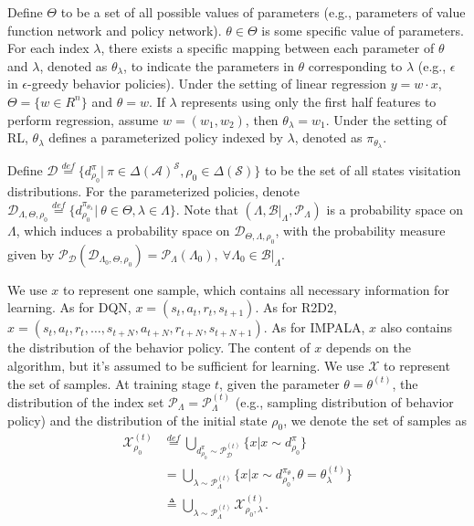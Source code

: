 Define $\Theta$ to be a set of all possible values of parameters (e.g., parameters of value function network and policy network).
$\theta \in \Theta$ is some specific value of parameters.
For each index $\lambda$, there exists a specific mapping between each parameter of $\theta$ and $\lambda$, denoted as $\theta_\lambda$, to indicate the parameters in $\theta$ corresponding to $\lambda$ (e.g., $\epsilon$ in $\epsilon$-greedy behavior policies).
Under the setting of linear regression $y = w \cdot x$, $\Theta = \{w \in R^n\}$ and $\theta = w$.
If $\lambda$ represents using only the first half features to perform regression, assume $w = (w_1, w_2)$, then $\theta_\lambda = w_1$.  
Under the setting of RL, $\theta_{\lambda}$ defines a parameterized policy indexed by $\lambda$, denoted as $\pi_{\theta_{\lambda}}$.

Define $\mathcal{D} \overset{def}{=} \{d^\pi_{\rho_{0}} |\ \pi \in {\Delta (\mathcal{A})}^\mathcal{S}, \rho_{0} \in \Delta(\mathcal{S}) \}$ to be the set of all states visitation distributions.
For the parameterized policies, denote 
$\mathcal{D}_{\Lambda, \Theta, \rho_{0}} \overset{def}{=} \{d^{\pi_{\theta_{\lambda}}}_{\rho_{0}} |\ \theta \in \Theta, \lambda \in \Lambda \}$.
Note that $(\Lambda, \mathcal{B}|_{\Lambda}, \mathcal{P}_{\Lambda})$ is a probability space on $\Lambda$, 
which induces a probability space on $\mathcal{D}_{\Theta, \Lambda, \rho_{0}}$,
with the probability measure given by 
$\mathcal{P}_{\mathcal{D}} (\mathcal{D}_{\Lambda_0, \Theta, \rho_{0}}) 
= \mathcal{P}_{\Lambda} (\Lambda_0),\ \forall \Lambda_0 \in \mathcal{B}|_\Lambda$.

We use $x$ to represent one sample, which contains all necessary information for learning. 
As for DQN, $x = (s_t, a_t, r_t, s_{t+1})$.
As for R2D2, $x = (s_t, a_t, r_t, \dots, s_{t+N}, a_{t+N}, r_{t+N}, s_{t+N+1})$.
As for IMPALA, $x$ also contains the distribution of the behavior policy.
The content of $x$ depends on the algorithm, but it's assumed to be sufficient for learning.
We use $\mathcal{X}$ to represent the set of samples.
At training stage $t$, 
given the parameter $\theta = \theta^{(t)}$, 
the distribution of the index set $\mathcal{P}_{\Lambda} = \mathcal{P}^{(t)}_{\Lambda}$ (e.g., sampling distribution of behavior policy)
and the distribution of the initial state $\rho_0$, 
we denote the set of samples as
\begin{equation*}
\begin{aligned}
    \mathcal{X}_{\rho_{0}}^{(t)}
    &\overset{def}{=} \bigcup_{d_{\rho_{0}}^\pi \sim \mathcal{P}_\mathcal{D}^{(t)}} \{ x | x \sim d_{\rho_{0}}^\pi \} \\
    &= \bigcup_{\lambda \sim \mathcal{P}_{\Lambda}^{(t)}} 
    \{ x | x \sim d_{\rho_{0}}^{\pi_\theta}, 
    \theta   = {\theta^{(t)}_{\lambda}} \}
    \\
    &\triangleq \bigcup_{\lambda \sim \mathcal{P}_{\Lambda}^{(t)}} \mathcal{X}^{(t)}_{\rho_{0}, \lambda}.
\end{aligned}
\end{equation*}



